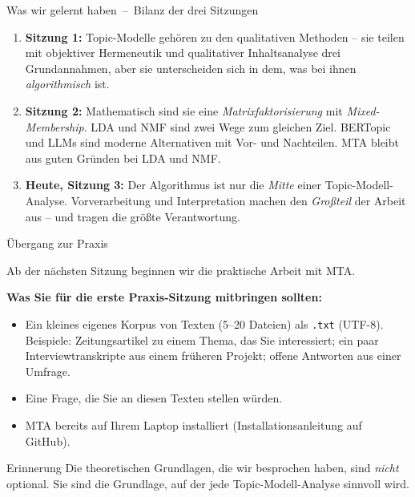 \documentclass[aspectratio=169,11pt]{beamer}
\newcommand{\mdash}{\,{\monodash–}\,}
\let\oldemph\emph
\renewcommand{\emph}[1]{{\color{solCyan}\oldemph{#1}}}
\let\oldtextbf\textbf
\renewcommand{\textbf}[1]{{\color{solBase3}\oldtextbf{#1}}}
\begin{document}
\begin{frame}{Was wir gelernt haben \mdash{} Bilanz der drei Sitzungen}

  \begin{enumerate}
    \item \textbf{Sitzung 1:} Topic-Modelle gehören zu den qualitativen
          Methoden – sie teilen mit objektiver Hermeneutik und
          qualitativer Inhaltsanalyse drei Grundannahmen, aber sie
          unterscheiden sich in dem, was bei ihnen \emph{algorithmisch}
          ist.
    \vfill
    \item \textbf{Sitzung 2:} Mathematisch sind sie eine
          \emph{Matrixfaktorisierung} mit \emph{Mixed-Membership}.
          LDA und NMF sind zwei Wege zum gleichen Ziel. BERTopic
          und LLMs sind moderne Alternativen mit Vor- und Nachteilen.
          MTA bleibt aus guten Gründen bei LDA und NMF.
    \vfill
    \item \textbf{Heute, Sitzung 3:} Der Algorithmus ist nur die
          \emph{Mitte} einer Topic-Modell-Analyse. Vorverarbeitung
          und Interpretation machen den \emph{Großteil} der Arbeit
          aus – und tragen die größte Verantwortung.
  \end{enumerate}

\end{frame}

\begin{frame}{Übergang zur Praxis}

  Ab der nächsten Sitzung beginnen wir die praktische Arbeit mit MTA.

  \vfill
  \textbf{Was Sie für die erste Praxis-Sitzung mitbringen sollten:}
  \begin{itemize}
    \item Ein kleines eigenes Korpus von Texten (5–20 Dateien)
          als \texttt{.txt} (UTF-8). \\
          \footnotesize Beispiele: Zeitungsartikel zu einem Thema, das
          Sie interessiert; ein paar Interviewtranskripte aus einem
          früheren Projekt; offene Antworten aus einer Umfrage.
          \normalsize
    \vfill
    \item Eine Frage, die Sie an diesen Texten stellen würden.
    \vfill
    \item MTA bereits auf Ihrem Laptop installiert (Installationsanleitung
          auf GitHub).
  \end{itemize}

  \vfill
  \begin{block}{Erinnerung}
    Die theoretischen Grundlagen, die wir besprochen haben, sind
    \emph{nicht} optional. Sie sind die Grundlage, auf der jede
    Topic-Modell-Analyse sinnvoll wird.
  \end{block}

\end{frame}
\end{document}
